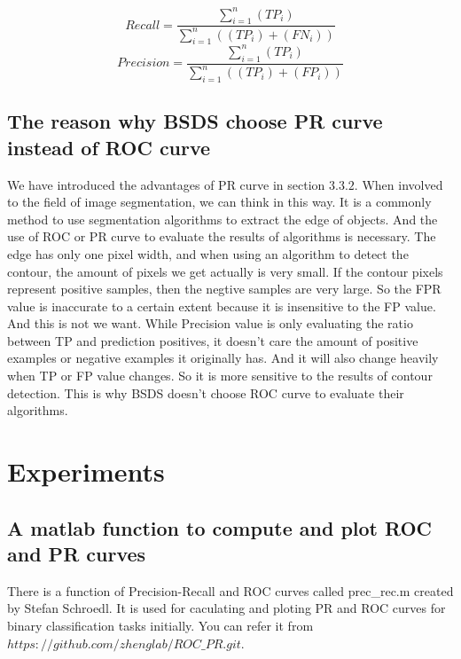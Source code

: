 \documentclass[a4paper,12pt]{article}
\begin{document}
\begin{equation}\label{eq:whole_Recall}
Recall=\frac{\displaystyle\sum_{i=1}^n(TP_i)}{\displaystyle\sum_{i=1}^n((TP_i)+(FN_i))}
\end{equation}
\begin{equation}\label{eq:whole_Precision}
Precision=\frac{\displaystyle\sum_{i=1}^n(TP_i)}{\displaystyle\sum_{i=1}^n((TP_i)+(FP_i))}
\end{equation}

\subsection{The reason why BSDS choose PR curve instead of ROC curve}
We have introduced the advantages of PR curve in section $3.3.2$. When involved to the field of image segmentation, we can think in this way. It is a commonly method to use segmentation algorithms to extract the edge of objects. And the use of ROC or PR curve to evaluate the results of algorithms is necessary. The edge has only one pixel width, and when using an algorithm to detect the contour, the amount of pixels we get actually is very small. If the contour pixels represent positive samples, then the negtive samples are very large. So the FPR value is inaccurate to a certain extent because it is insensitive to the FP value. And this is not we want. While Precision value is only evaluating the ratio between TP and prediction positives, it doesn't care the amount of positive examples or negative examples it originally has. And it will also change heavily when TP or FP value changes. So it is more sensitive to the results of contour detection. This is why BSDS doesn't choose ROC curve to evaluate their algorithms\cite{6:misc}.  



\section{Experiments}

\subsection{A matlab function to compute and plot ROC and PR curves}
There is a function of Precision-Recall and ROC curves called prec\_rec.m created by Stefan Schroedl. It is used for caculating and ploting PR and ROC curves for binary classification tasks initially.
You can refer it from $https://github.com/zhenglab/ROC\_PR.git$.
\end{document}
